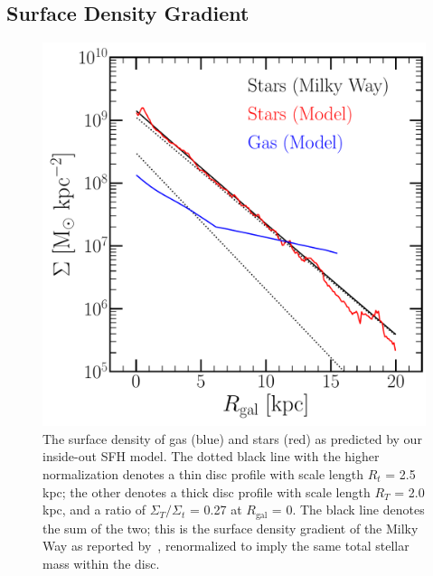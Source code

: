 \documentclass[fleqn, usenatbib]{mnras}
\begin{document}
\subsection{Surface Density Gradient} 
\label{sec:methods:surface_density_gradient} 

\begin{figure} 
\centering 
\includegraphics[scale = 0.45]{surface_density_gradient.pdf} 
\caption{The surface density of gas (blue) and stars (red) as predicted by our 
inside-out SFH model. The dotted black line with the higher normalization 
denotes a thin disc profile with scale length $R_t$ = 2.5 kpc; the other 
denotes a thick disc profile with scale length $R_T$ = 2.0 kpc, and a ratio of 
$\Sigma_T/\Sigma_t$ = 0.27 at $R_\text{gal}$ = 0. The black line denotes the 
sum of the two; this is the surface density gradient of the Milky Way as 
reported by~\citet{Bland-Hawthorn2016}, renormalized to imply the same total 
stellar mass within the disc. } 
\label{fig:surface_density} 
\end{figure} 
\end{document}

